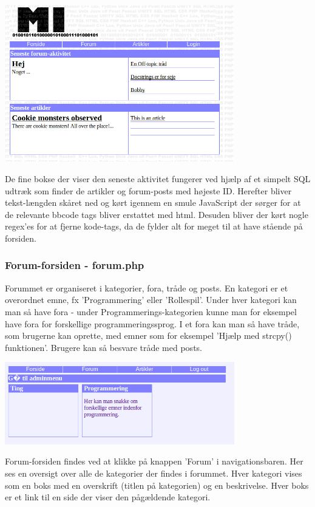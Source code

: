\documentclass{article}
\begin{document}
\includegraphics[width=100mm]{mi19.png}

De fine bokse der viser den seneste aktivitet fungerer ved hjælp af et simpelt SQL udtræk som finder de artikler og forum-posts med højeste ID. Herefter bliver tekst-længden skåret ned og kørt igennem en smule JavaScript der sørger for at de relevante bbcode tags bliver erstattet med html. Desuden bliver der kørt nogle regex'es for at fjerne kode-tags, da de fylder alt for meget til at have stående på forsiden.

\subsubsection[Forum-forsiden]{Forum-forsiden - forum.php}
Forummet er organiseret i kategorier, fora, tråde og posts. En kategori er et overordnet emne, fx 'Programmering' eller 'Rollespil'. Under hver kategori kan man så have fora - under Programmerings-kategorien kunne man for eksempel have fora for forskellige programmeringssprog. I et fora kan man så have tråde, som brugerne kan oprette, med emner som for eksempel 'Hjælp med strcpy() funktionen'. Brugere kan så besvare tråde med posts.

\includegraphics[width=100mm]{mi06.png}

Forum-forsiden findes ved at klikke på knappen 'Forum' i navigationsbaren. Her ses en oversigt over alle de kategorier der findes i forummet. Hver kategori vises som en boks med en overskrift (titlen på kategorien) og en beskrivelse. Hver boks er et link til en side der viser den pågældende kategori.
\end{document}
